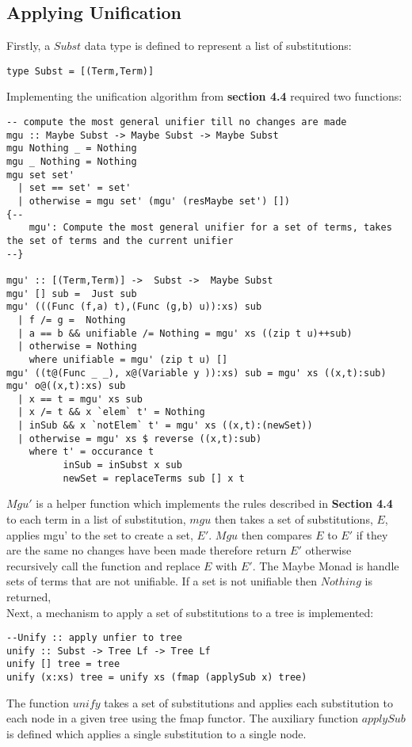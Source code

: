 \documentclass{article}%
\begin{document}
\subsection{Applying Unification}
Firstly, a $Subst$ data type is defined to represent a list of substitutions:
\begin{verbatim}
type Subst = [(Term,Term)]

\end{verbatim}
Implementing the unification algorithm from \textbf{section 4.4} required two functions:
\begin{verbatim}
-- compute the most general unifier till no changes are made 
mgu :: Maybe Subst -> Maybe Subst -> Maybe Subst 
mgu Nothing _ = Nothing
mgu _ Nothing = Nothing
mgu set set' 
  | set == set' = set' 
  | otherwise = mgu set' (mgu' (resMaybe set') [])
{--
    mgu': Compute the most general unifier for a set of terms, takes the set of terms and the current unifier
--}

mgu' :: [(Term,Term)] ->  Subst ->  Maybe Subst 
mgu' [] sub =  Just sub 
mgu' (((Func (f,a) t),(Func (g,b) u)):xs) sub
  | f /= g =  Nothing
  | a == b && unifiable /= Nothing = mgu' xs ((zip t u)++sub)
  | otherwise = Nothing 
    where unifiable = mgu' (zip t u) [] 
mgu' ((t@(Func _ _), x@(Variable y )):xs) sub = mgu' xs ((x,t):sub)
mgu' o@((x,t):xs) sub 
  | x == t = mgu' xs sub
  | x /= t && x `elem` t' = Nothing
  | inSub && x `notElem` t' = mgu' xs ((x,t):(newSet)) 
  | otherwise = mgu' xs $ reverse ((x,t):sub)
    where t' = occurance t
          inSub = inSubst x sub
          newSet = replaceTerms sub [] x t
\end{verbatim}
$Mgu'$ is a helper function which implements the rules described in \textbf{Section 4.4} to each term in a list of substitution, $mgu$ then takes a set of substitutions, $E$, applies mgu' to the set to create a set, $E'$. $Mgu$ then compares $E$ to $E'$ if they are the same no changes have been made therefore return $E'$ otherwise recursively call the function and replace $E$ with $E'$. The Maybe Monad is handle sets of terms that are not unifiable. If a set is not unifiable then $Nothing$ is returned, \\
Next, a mechanism to apply a set of substitutions to a tree is implemented: 
\begin{verbatim}
--Unify :: apply unfier to tree 
unify :: Subst -> Tree Lf -> Tree Lf 
unify [] tree = tree
unify (x:xs) tree = unify xs (fmap (applySub x) tree)
\end{verbatim}
The function $unify$ takes a set of substitutions and applies each substitution to each node in a given tree using the fmap functor. The auxiliary function $applySub$ is defined which applies a single substitution to a single node. \\\\
\end{document}
